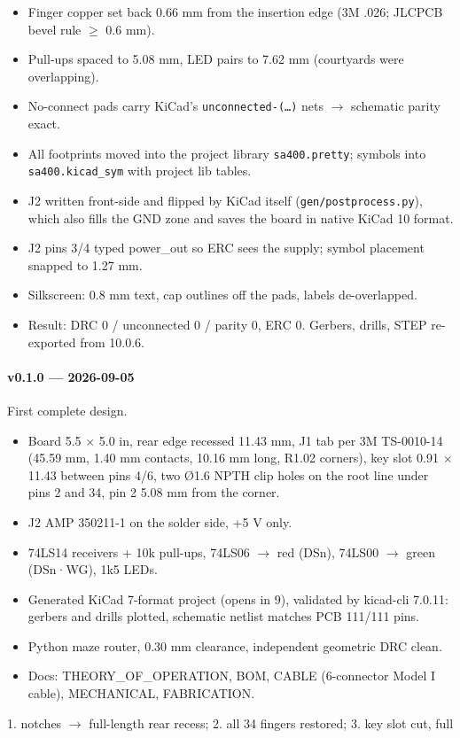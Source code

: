 \documentclass[11pt,a4paper]{article}
\begin{document}
\begin{itemize}[leftmargin=8mm]
\item Finger copper set back 0.66 mm from the insertion edge (3M .026; JLCPCB bevel rule $\ge$ 0.6 mm).
\item Pull-ups spaced to 5.08 mm, LED pairs to 7.62 mm (courtyards were overlapping).
\item No-connect pads carry KiCad's \texttt{unconnected-(…)} nets $\to$ schematic parity exact.
\item All footprints moved into the project library \texttt{sa400.pretty}; symbols into \texttt{sa400.kicad\_sym} with project lib tables.
\item J2 written front-side and flipped by KiCad itself (\texttt{gen/postprocess.py}), which also fills the GND zone and saves the board in native KiCad 10 format.
\item J2 pins 3/4 typed power\_out so ERC sees the supply; symbol placement snapped to 1.27 mm.
\item Silkscreen: 0.8 mm text, cap outlines off the pads, labels de-overlapped.
\item Result: DRC 0 / unconnected 0 / parity 0, ERC 0. Gerbers, drills, STEP re-exported from 10.0.6.
\end{itemize}
\paragraph{v0.1.0 — 2026-09-05}
First complete design.

\begin{itemize}[leftmargin=8mm]
\item Board 5.5 $\times$ 5.0 in, rear edge recessed 11.43 mm, J1 tab per 3M TS-0010-14 (45.59 mm, 1.40 mm contacts, 10.16 mm long, R1.02 corners), key slot 0.91 $\times$ 11.43 between pins 4/6, two Ø1.6 NPTH clip holes on the root line under pins 2 and 34, pin 2 5.08 mm from the corner.
\item J2 AMP 350211-1 on the solder side, +5 V only.
\item 74LS14 receivers + 10k pull-ups, 74LS06 $\to$ red (DSn), 74LS00 $\to$ green (DSn·WG), 1k5 LEDs.
\item Generated KiCad 7-format project (opens in 9), validated by kicad-cli 7.0.11: gerbers and drills plotted, schematic netlist matches PCB 111/111 pins.
\item Python maze router, 0.30 mm clearance, independent geometric DRC clean.
\item Docs: THEORY\_OF\_OPERATION, BOM, CABLE (6-connector Model I cable), MECHANICAL, FABRICATION.
\end{itemize}
1. notches $\to$ full-length rear recess; 2. all 34 fingers restored; 3. key slot cut, full
\end{document}
